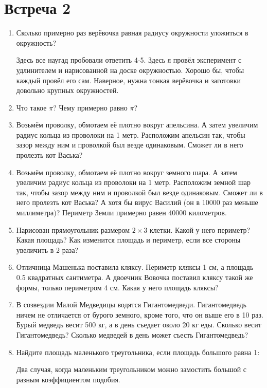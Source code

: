 \documentclass[a4paper, 12pt]{article}
\begin{document}
\newpage
\section{Встреча 2}

\begin{enumerate}

  \item Сколько примерно раз верёвочка равная радиусу окружности уложиться в окружность?

   Здесь все наугад пробовали ответить 4-5.
   Здесь я провёл эксперимент с удлинителем и нарисованной на доске окружностью. 
   Хорошо бы, чтобы каждый провёл его сам. 
   Наверное, нужна тонкая верёвочка и заготовки довольно крупных окружностей.

  \item Что такое $\pi$? Чему примерно равно $\pi$?

  \item Возьмём проволку, обмотаем её плотно вокруг апельсина. А затем увеличим радиус кольца из проволоки на 1 метр. Расположим апельсин так, чтобы зазор между ним и проволкой был везде одинаковым. Сможет ли в него пролезть кот Васька?

  \item Возьмём проволку, обмотаем её плотно вокруг земного шара. А затем увеличим радиус кольца из проволоки на 1 метр. Расположим земной шар так, чтобы зазор между ним и проволкой был везде одинаковым. Сможет ли в него пролезть кот Васька? А хотя бы вирус Василий (он в 10000 раз меньше миллиметра)? Периметр Земли примерно равен 40000 километров.

    \item Нарисован прямоугольник размером $2\times 3$ клетки. Какой у него периметр? Какая площадь? Как изменится площадь и периметр, если все стороны увеличить в 2 раза?


  \item Отличница Машенька поставила кляксу. Периметр кляксы 1 см, а площадь 0.5 квадратных сантиметра. А двоечник Вовочка поставил кляксу такой же формы, только периметром 4 см. Какая у него площадь кляксы?

  \item В созвездии Малой Медведицы водятся Гигантомедведи. Гигантомедведь ничем не отличается от бурого земного, кроме того, что он выше его в 10 раз. Бурый медведь весит 500 кг, а в день съедает около 20 кг еды. Сколько весит Гигантомедведь? Сколько медведей в день может съесть Гигантомедведь?

  \item Найдите площадь маленького треугольника, если площадь большого равна 1:

    Два случая, когда маленьким треугольником можно замостить большой с разным коэффициентом подобия.
    
    \vspace{5cm}



\end{enumerate}
\end{document}
